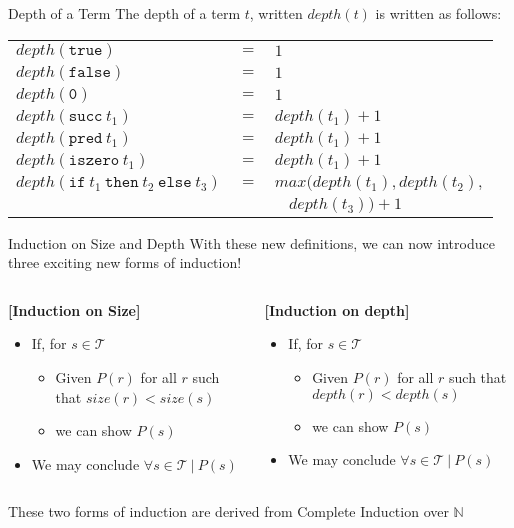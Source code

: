 \documentclass[11pt]{beamer}
\begin{document}
\begin{frame}[fragile=singleslide]{Depth of a Term}
The depth of a term $t$, written $depth(t)$ is written as follows: \\
\vspace{0.5em}
\begin{tabular}{ l  l  l }
$depth(\texttt{true})$ & $=$ & $1$ \\ 
$depth(\texttt{false})$ & $=$ & $1$ \\
$depth(\texttt{0})$ & $=$ & $1$ \\
$depth(\texttt{succ}\: t_1)$ & $=$ & $depth(t_1) + 1$ \\
$depth(\texttt{pred}\: t_1)$ & $=$ & $depth(t_1) + 1$ \\
$depth(\texttt{iszero}\: t_1)$ & $=$ & $depth(t_1) + 1$ \\
$depth(\texttt{if}\: t_1 \:\texttt{then}\: t_2 \:\texttt{else}\: t_3)$ & $=$ & $max(depth(t_1), depth(t_2),$ \\
 & & $\:\:\:\: depth(t_3)) + 1$ \\
\end{tabular}
\end{frame}

\begin{frame}[fragile=singleslide]{Induction on Size and Depth}
With these new definitions, we can now introduce three exciting new forms of induction! 
\vspace{0.5em}
\begin{columns}
\begin{column}{0.5\textwidth}
\textbf{[Induction on Size]}
\begin{itemize}
\item If, for $s \in \mathcal{T}$
\begin{itemize}
\item Given $P(r)$ for all $r$ such that $size(r) < size(s)$
\item we can show $P(s)$
\end{itemize}
\item We may conclude $\forall s \in \mathcal{T} \:|\: P(s)$
\end{itemize}
\end{column}
\begin{column}{0.5\textwidth}
\textbf{[Induction on depth]}
\begin{itemize}
\item If, for $s \in \mathcal{T}$
\begin{itemize}
\item Given $P(r)$ for all $r$ such that $depth(r) < depth(s)$
\item we can show $P(s)$
\end{itemize}
\item We may conclude $\forall s \in \mathcal{T} \:|\: P(s)$
\end{itemize}
\end{column}
\end{columns}
\vspace{0.5em}
These two forms of induction are derived from Complete Induction over $\mathbb{N}$
\end{frame}
\end{document}
